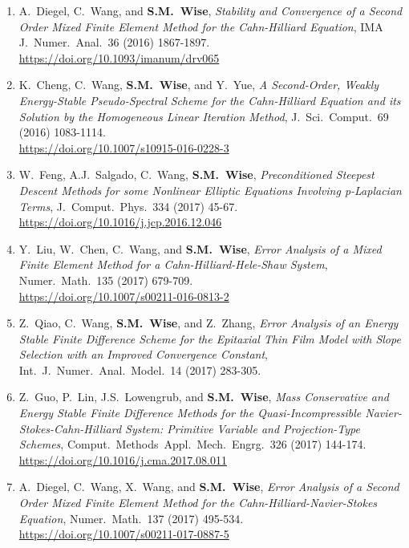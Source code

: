 \documentclass[11pt]{letter}
\begin{document}
\begin{enumerate}
	\item
A.~Diegel, C.~Wang, and \textbf{S.M.~Wise}, {\sl Stability and Convergence of a Second Order Mixed Finite Element Method for the Cahn-Hilliard Equation}, IMA J.~Numer.~Anal.~36 (2016) 1867-1897.
	\\ 
\url{https://doi.org/10.1093/imanum/drv065}

	\item
K.~Cheng, C.~Wang, \textbf{S.M.~Wise}, and Y.~Yue, {\sl A Second-Order, Weakly Energy-Stable Pseudo-Spectral Scheme for the Cahn-Hilliard Equation and its Solution by the Homogeneous Linear Iteration Method}, J.~Sci.~Comput.~69 (2016) 1083-1114.
	\\ 
\url{https://doi.org/10.1007/s10915-016-0228-3}

	\item
W.~Feng, A.J.~Salgado, C.~Wang, \textbf{S.M.~Wise}, {\sl Preconditioned Steepest Descent Methods for some Nonlinear Elliptic Equations Involving p-Laplacian Terms}, J.~Comput.~Phys.~334 (2017) 45-67.
	\\ 
\url{https://doi.org/10.1016/j.jcp.2016.12.046}

	\item
Y.~Liu, W.~Chen, C.~Wang, and \textbf{S.M.~Wise}, {\sl Error Analysis of a Mixed Finite Element Method for a Cahn-Hilliard-Hele-Shaw System}, Numer.~Math.~135 (2017) 679-709.
	\\ 
\url{https://doi.org/10.1007/s00211-016-0813-2}

	\item
Z.~Qiao, C.~Wang, \textbf{S.M.~Wise}, and Z.~Zhang, {\sl Error Analysis of an Energy Stable Finite Difference Scheme for the Epitaxial Thin Film Model with Slope Selection with an Improved Convergence Constant}, Int.~J.~Numer.~Anal.~Model.~14 (2017) 283-305.

	\item
Z.~Guo, P.~Lin, J.S.~Lowengrub, and \textbf{S.M.~Wise}, {\sl Mass Conservative and Energy Stable Finite Difference Methods for the Quasi-Incompressible Navier-Stokes-Cahn-Hilliard System: Primitive Variable and Projection-Type Schemes}, Comput.~Methods~Appl.~Mech.~Engrg.~326 (2017) 144-174.
	\\ 
\url{https://doi.org/10.1016/j.cma.2017.08.011}

	\item
A.~Diegel, C.~Wang, X.~Wang, and \textbf{S.M.~Wise}, {\sl Error Analysis of a Second Order Mixed Finite Element Method for the Cahn-Hilliard-Navier-Stokes Equation}, Numer.~Math.~137 (2017) 495-534.
	\\ 
\url{https://doi.org/10.1007/s00211-017-0887-5}


\end{enumerate}
\end{document}
